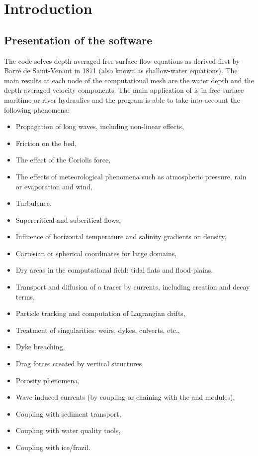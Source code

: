 \chapter{Introduction}
\label{ch:intro}


\section{Presentation of the  software}

The  code solves depth-averaged free surface flow equations as
derived first by Barr\'{e} de Saint-Venant in 1871 (also known as shallow-water
equations).
The main results at each node of the computational mesh are the water depth
and the depth-averaged velocity components.
The main application of  is in free-surface maritime
or river hydraulics and the program is able to take into account the following
phenomena:

\begin{itemize}
\item Propagation of long waves, including non-linear effects,
\item Friction on the bed,
\item The effect of the Coriolis force,
\item The effects of meteorological phenomena such as atmospheric pressure, rain
 or evaporation and wind,
\item Turbulence,
\item Supercritical and subcritical flows,
\item Influence of horizontal temperature and salinity gradients on density,
\item Cartesian or spherical coordinates for large domains,
\item Dry areas in the computational field: tidal flats and flood-plains,
\item Transport and diffusion of a tracer by currents, including creation
and decay terms,
\item Particle tracking and computation of Lagrangian drifts,
\item Treatment of singularities: weirs, dykes, culverts, etc.,
\item Dyke breaching,
\item Drag forces created by vertical structures,
\item Porosity phenomena,
\item Wave-induced currents (by coupling or chaining with the \artemis and
\tomawac modules),
\item Coupling with sediment transport,
\item Coupling with water quality tools,
\item Coupling with ice/frazil.
\end{itemize}

